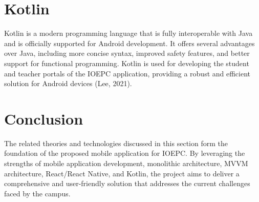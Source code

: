 \section{Kotlin}
Kotlin is a modern programming language that is fully interoperable with Java and is officially supported for Android development. It offers several advantages over Java, including more concise syntax, improved safety features, and better support for functional programming. Kotlin is used for developing the student and teacher portals of the IOEPC application, providing a robust and efficient solution for Android devices (Lee, 2021).

\section{Conclusion}
The related theories and technologies discussed in this section form the foundation of the proposed mobile application for IOEPC. By leveraging the strengths of mobile application development, monolithic architecture, MVVM architecture, React/React Native, and Kotlin, the project aims to deliver a comprehensive and user-friendly solution that addresses the current challenges faced by the campus.